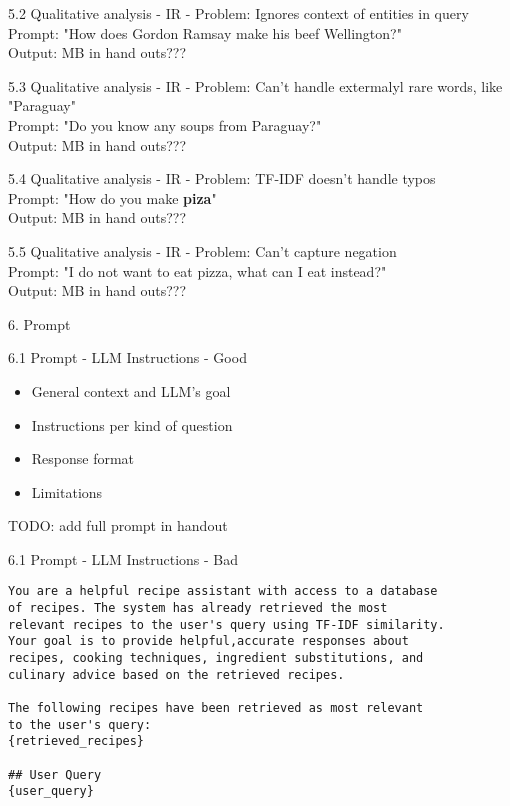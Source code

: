 \documentclass{beamer}
\begin{document}
\begin{frame} {5.2 Qualitative analysis - IR - }
  Problem: Ignores context of entities in query\\
  Prompt: "How does Gordon Ramsay make his beef Wellington?"\\
  Output: MB in hand outs???
\end{frame}

\begin{frame} {5.3 Qualitative analysis - IR - }
  Problem: Can't handle extermalyl rare words, like "Paraguay"\\
  Prompt: "Do you know any soups from Paraguay?"\\
  Output: MB in hand outs???
\end{frame}

\begin{frame} {5.4 Qualitative analysis - IR - }
  Problem: TF-IDF doesn't handle typos\\
  Prompt: "How do you make \textbf{piza}"\\
  Output: MB in hand outs???
\end{frame}

\begin{frame} {5.5 Qualitative analysis - IR - }
  Problem: Can't capture negation\\
  Prompt:  "I do not want to eat pizza, what can I eat instead?"\\
  Output: MB in hand outs???
\end{frame}

\begin{frame}{6. Prompt}
\end{frame}

\begin{frame}[fragile]{6.1 Prompt - LLM Instructions - Good}
  \begin{itemize}
    \item General context and LLM's goal
    \item Instructions per kind of question
    \item Response format
    \item Limitations
  \end{itemize}
  TODO: add full prompt in handout
\end{frame}

\begin{frame}[fragile]{6.1 Prompt - LLM Instructions - Bad}
\begin{verbatim}
You are a helpful recipe assistant with access to a database
of recipes. The system has already retrieved the most
relevant recipes to the user's query using TF-IDF similarity.
Your goal is to provide helpful,accurate responses about
recipes, cooking techniques, ingredient substitutions, and
culinary advice based on the retrieved recipes.

The following recipes have been retrieved as most relevant
to the user's query:
{retrieved_recipes}

## User Query
{user_query}

\end{verbatim}
\end{frame}
\end{document}

